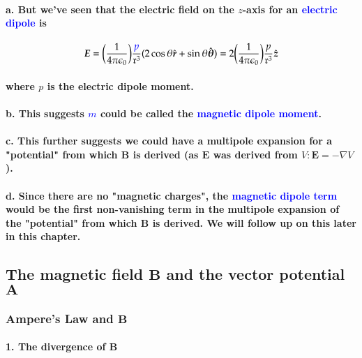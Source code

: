 \documentclass{article}
\begin{document}
\paragraph{\indent a. But we've seen that the electric field on the $z$-axis for an \textcolor{blue}{electric dipole} is}
\begin{equation*}
    \boldsymbol{E}=\bigg(\frac{1}{4\pi\epsilon_0}\bigg)\frac{\textcolor{blue}{p}}{\mathfrak{r}^3}(2\cos\theta\hat{\boldsymbol{r}}+\sin\theta\hat{\boldsymbol{\theta}})=2\bigg(\frac{1}{4\pi\epsilon_0}\bigg)\frac{p}{\mathfrak{r}^3}\hat{\boldsymbol{z}}
\end{equation*}
\paragraph{where $p$ is the electric dipole moment.}
\paragraph{\indent b. This suggests \textcolor{blue}{$m$} could be called the \textcolor{blue}{magnetic dipole moment}.}
\paragraph{\indent c. This further suggests we could have a multipole expansion for a "potential" from which $\boldsymbol{B}$ is derived (as $\boldsymbol{E}$ was derived from $V:\boldsymbol{E}=-\nabla V$).}
\paragraph{\indent d. Since there are no "magnetic charges", the \textcolor{blue}{magnetic dipole term} would be the first non-vanishing term in the multipole expansion of the "potential" from which $\boldsymbol{B}$ is derived. We will follow up on this later in this chapter.}
\subsection{The magnetic field $\boldsymbol{B}$ and the vector potential $\boldsymbol{A}$}
\subsubsection{Ampere's Law and $\boldsymbol{B}$}
\paragraph{1. The divergence of $\boldsymbol{B}$}
\end{document}
